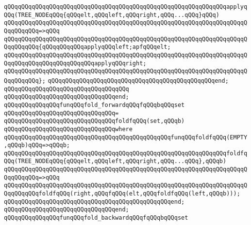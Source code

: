 \newline
\verb|qQQqqQQqqQQqqQQqqQQqqQQqqQQqqQQqqQQqqQQqqQQqqQQqqQQqqQQqqQQqqQQqapplyqQQq(TREE_NODEqQQq{qQQqelt,qQQqleft,qQQqright,qQQq...qQQq}qQQq)|\newline
\verb|qQQqqQQqqQQqqQQqqQQqqQQqqQQqqQQqqQQqqQQqqQQqqQQqqQQqqQQqqQQqqQQqqQQqqQQqqQQqqQQq=>qQQq|\newline
\verb|qQQqqQQqqQQqqQQqqQQqqQQqqQQqqQQqqQQqqQQqqQQqqQQqqQQqqQQqqQQqqQQqqQQqqQQqqQQqqQQq{qQQqqQQqqQQqapplyqQQqleft;apfqQQqelt;|\newline
\verb|qQQqqQQqqQQqqQQqqQQqqQQqqQQqqQQqqQQqqQQqqQQqqQQqqQQqqQQqqQQqqQQqqQQqqQQqqQQqqQQqqQQqqQQqqQQqqQQqapplyqQQqright;|\newline
\verb|qQQqqQQqqQQqqQQqqQQqqQQqqQQqqQQqqQQqqQQqqQQqqQQqqQQqqQQqqQQqqQQqqQQqqQQqqQQqqQQq};|\newline
\verb|qQQqqQQqqQQqqQQqqQQqqQQqqQQqqQQqqQQqqQQqqQQqqQQqend;|\newline
\verb|qQQqqQQqqQQqqQQqqQQqqQQqqQQqqQQqqQQq|\newline
\verb|qQQqqQQqqQQqqQQqqQQqqQQqqQQqqQQqend;|\newline
\newline
\verb|qQQqqQQqqQQqqQQqfunqQQqfold_forwardqQQqfqQQqbqQQqset|\newline
\verb|qQQqqQQqqQQqqQQqqQQqqQQqqQQqqQQq=|\newline
\verb|qQQqqQQqqQQqqQQqqQQqqQQqqQQqqQQqfoldfqQQq(set,qQQqb)|\newline
\verb|qQQqqQQqqQQqqQQqqQQqqQQqqQQqqQQqwhere|\newline
\verb|qQQqqQQqqQQqqQQqqQQqqQQqqQQqqQQqqQQqqQQqqQQqqQQqfunqQQqfoldfqQQq(EMPTY,qQQqb)qQQq=>qQQqb;|\newline
\newline
\verb|qQQqqQQqqQQqqQQqqQQqqQQqqQQqqQQqqQQqqQQqqQQqqQQqqQQqqQQqqQQqqQQqfoldfqQQq(TREE_NODEqQQq{qQQqelt,qQQqleft,qQQqright,qQQq...qQQq},qQQqb)|\newline
\verb|qQQqqQQqqQQqqQQqqQQqqQQqqQQqqQQqqQQqqQQqqQQqqQQqqQQqqQQqqQQqqQQqqQQqqQQqqQQqqQQq=>qQQq|\newline
\verb|qQQqqQQqqQQqqQQqqQQqqQQqqQQqqQQqqQQqqQQqqQQqqQQqqQQqqQQqqQQqqQQqqQQqqQQqqQQqqQQqfoldfqQQq(right,qQQqfqQQq(elt,qQQqfoldfqQQq(left,qQQqb)));|\newline
\verb|qQQqqQQqqQQqqQQqqQQqqQQqqQQqqQQqqQQqqQQqqQQqqQQqend;|\newline
\verb|qQQqqQQqqQQqqQQqqQQqqQQqqQQqqQQqend;|\newline
\newline
\verb|qQQqqQQqqQQqqQQqfunqQQqfold_backwardqQQqfqQQqbqQQqset|\newline
